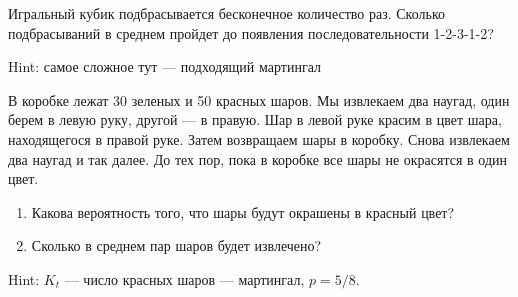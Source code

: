 \begin{problem}
Игральный кубик подбрасывается бесконечное количество раз. Сколько подбрасываний в среднем пройдет до появления последовательности 1-2-3-1-2?

\begin{sol}

Hint: самое сложное тут — подходящий мартингал
\end{sol}
\end{problem}

\begin{problem}
В коробке лежат 30 зеленых и 50 красных шаров. Мы извлекаем два наугад, один берем в левую руку, другой — в правую. Шар в левой руке красим в цвет шара, находящегося в правой руке. Затем возвращаем шары в коробку. Снова извлекаем два наугад и так далее. До тех пор, пока в коробке все шары не окрасятся в один цвет.
\begin{enumerate}
\item  Какова вероятность того, что шары будут окрашены в красный цвет?
\item  Сколько в среднем пар шаров будет извлечено?
\end{enumerate}


\begin{sol}

Hint: $K_{t}$ — число красных шаров — мартингал, $p=5/8$.
\end{sol}
\end{problem}





